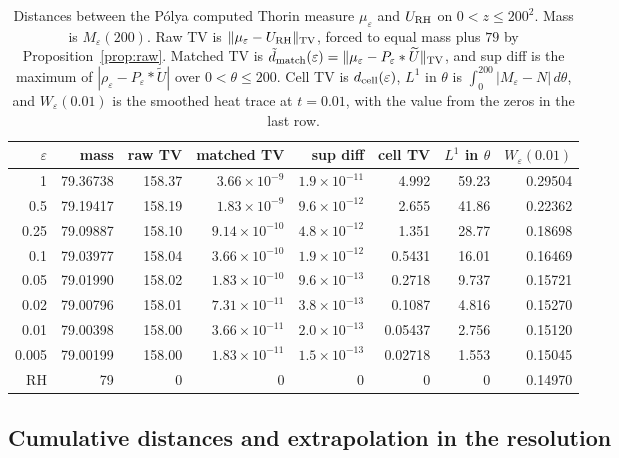 \begin{table}[t]
\centering\small\setlength{\tabcolsep}{4pt}
\begin{tabular}{rrrrrrrr}
\toprule
$\varepsilon$ & mass & raw TV & matched TV & sup diff & cell TV & $L^1$ in $\theta$ & $W_\varepsilon(0.01)$\\
\midrule
1 & 79.36738 & 158.37 & $3.66\times10^{-9}$ & $1.9\times10^{-11}$ & 4.992 & 59.23 & 0.29504\\
0.5 & 79.19417 & 158.19 & $1.83\times10^{-9}$ & $9.6\times10^{-12}$ & 2.655 & 41.86 & 0.22362\\
0.25 & 79.09887 & 158.10 & $9.14\times10^{-10}$ & $4.8\times10^{-12}$ & 1.351 & 28.77 & 0.18698\\
0.1 & 79.03977 & 158.04 & $3.66\times10^{-10}$ & $1.9\times10^{-12}$ & 0.5431 & 16.01 & 0.16469\\
0.05 & 79.01990 & 158.02 & $1.83\times10^{-10}$ & $9.6\times10^{-13}$ & 0.2718 & 9.737 & 0.15721\\
0.02 & 79.00796 & 158.01 & $7.31\times10^{-11}$ & $3.8\times10^{-13}$ & 0.1087 & 4.816 & 0.15270\\
0.01 & 79.00398 & 158.00 & $3.66\times10^{-11}$ & $2.0\times10^{-13}$ & 0.05437 & 2.756 & 0.15120\\
0.005 & 79.00199 & 158.00 & $1.83\times10^{-11}$ & $1.5\times10^{-13}$ & 0.02718 & 1.553 & 0.15045\\
\midrule
RH & 79 & 0 & 0 & 0 & 0 & 0 & 0.14970\\
\bottomrule
\end{tabular}
\caption{Distances between the P\'olya computed Thorin measure $\mu_\varepsilon$ and $U_{\mathrm{RH}}$ on $0<z\le200^2$. Mass is $M_\varepsilon(200)$. Raw TV is $\lVert \mu_\varepsilon-U_{\mathrm{RH}}\rVert_{\mathrm{TV}}$, forced to equal mass plus $79$ by Proposition~\ref{prop:raw}. Matched TV is $\tilde d_{\rm match}(\varepsilon)=\lVert \mu_\varepsilon-P_\varepsilon*\widetilde U\rVert_{\mathrm{TV}}$, and sup diff is the maximum of $|\rho_\varepsilon-P_\varepsilon*\widetilde U|$ over $0<\theta\le200$. Cell TV is $d_{\rm cell}(\varepsilon)$, $L^1$ in $\theta$ is $\int_0^{200}|M_\varepsilon-N|\,d\theta$, and $W_\varepsilon(0.01)$ is the smoothed heat trace at $t=0.01$, with the value from the zeros in the last row.}
\label{tab:tv}
\end{table}

\subsection{Cumulative distances and extrapolation in the resolution}\label{sec:ch7:cumulative}

